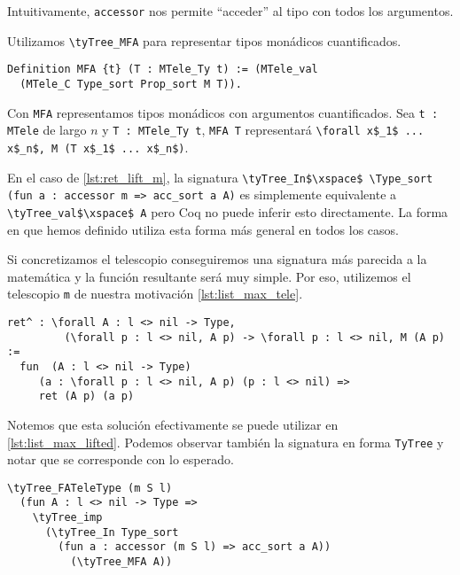 Intuitivamente, \lstinline{accessor} nos permite ``acceder'' al tipo con todos los argumentos.

Utilizamos \lstinline{\tyTree_MFA} para representar tipos monádicos cuantificados. %

\begin{lstlisting}[frame=tb,caption={Definición de \lstinline{MFA}},label=lst:mfa]
Definition MFA {t} (T : MTele_Ty t) := (MTele_val
  (MTele_C Type_sort Prop_sort M T)).
\end{lstlisting}

Con \lstinline{MFA} representamos tipos monádicos con argumentos cuantificados. 
Sea \lstinline{t : MTele} de largo $n$ y \lstinline{T : MTele_Ty t}, \lstinline{MFA T} representará \lstinline{\forall x$_1$ ... x$_n$, M (T x$_1$ ... x$_n$)}.

En el caso de \ref{lst:ret_lift_m}, la signatura \lstinline{\tyTree_In$\xspace$ \Type_sort (fun a : accessor m => acc_sort a A)} es simplemente equivalente a \lstinline{\tyTree_val$\xspace$ A} pero Coq no puede inferir esto directamente.
La forma en que hemos definido \lift utiliza esta forma más general en todos los casos.

Si concretizamos el telescopio conseguiremos una signatura más parecida a la matemática y la función resultante será muy simple. Por eso, utilizemos el telescopio \lstinline{m} de nuestra motivación \ref{lst:list_max_tele}.

\begin{lstlisting}[frame=tb,caption={Ejemplo de \lstinline{ret^}},label=lst:exmp_ret]
ret^ : \forall A : l <> nil -> Type,
         (\forall p : l <> nil, A p) -> \forall p : l <> nil, M (A p) :=
  fun  (A : l <> nil -> Type)
     (a : \forall p : l <> nil, A p) (p : l <> nil) => 
     ret (A p) (a p)
\end{lstlisting}

Notemos que esta solución efectivamente se puede utilizar en \ref{lst:list_max_lifted}. Podemos observar también la signatura en forma \lstinline{TyTree} y notar que se corresponde con lo esperado.

\begin{lstlisting}[frame=tb,caption={Signatura en \lstinline{TyTree} de \lstinline{ret^}},label=lst:exmp_ret_tytree]
\tyTree_FATeleType (m S l)
  (fun A : l <> nil -> Type =>
    \tyTree_imp
      (\tyTree_In Type_sort
        (fun a : accessor (m S l) => acc_sort a A))
          (\tyTree_MFA A))
\end{lstlisting}

